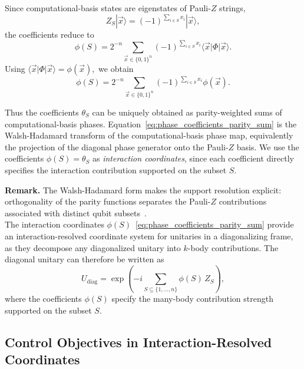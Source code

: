 Since computational-basis states are eigenstates of Pauli-$Z$ strings,
\begin{equation}
Z_S|\vec{x}\rangle
=
(-1)^{\sum_{i\in S}x_i}|\vec{x}\rangle,
\end{equation}
the coefficients reduce to
\begin{equation}
\phi(S)
=
2^{-n}
\sum_{\vec{x}\in\{0,1\}^n}
(-1)^{\sum_{i\in S}x_i}
\langle\vec{x}|\Phi|\vec{x}\rangle.
\end{equation}
Using
\(
\langle\vec{x}|\Phi|\vec{x}\rangle=\phi(\vec{x}),
\)
we obtain
\begin{equation}
\phi(S)
=
2^{-n}
\sum_{\vec{x}\in\{0,1\}^n}
(-1)^{\sum_{i\in S}x_i}
\phi(\vec{x}).
\label{eq:phase_coefficients_parity_sum}
\end{equation}

\medskip
\noindent
Thus the coefficients $\theta_S$ can be uniquely obtained as parity-weighted sums of computational-basis phases. Equation~\eqref{eq:phase_coefficients_parity_sum} is the Walsh-Hadamard transform of the computational-basis phase map, equivalently the projection of the diagonal phase generator onto the Pauli-$Z$ basis. We use the coefficients $\phi(S)=\theta_S$ as \emph{interaction coordinates}, since each coefficient directly specifies the interaction contribution supported on the subset $S$.

\medskip
\noindent
\textbf{Remark.}
The Walsh-Hadamard form makes the support resolution explicit: orthogonality of the parity functions separates the Pauli-$Z$ contributions associated with distinct qubit subsets~\cite{welch2014efficient}.\\

\noindent
The interaction coordinates $\phi(S)$~\eqref{eq:phase_coefficients_parity_sum} provide an interaction-resolved coordinate system for unitaries in a diagonalizing frame, as they decompose any diagonalized unitary into $k$-body contributions. The diagonal unitary can therefore be written as
\begin{equation}
U_{\mathrm{diag}}
=
\exp\!\left(-
i\sum_{S\subseteq\{1,\dots,n\}}
\phi(S)\, Z_S
\right),
\label{eq:phi_expansion_u_diag}
\end{equation}
where the coefficients $\phi(S)$ specify the many-body contribution strength supported on the subset $S$.


\subsection{Control Objectives in Interaction-Resolved Coordinates}
\label{sec:control_objective_phase_invariants}

